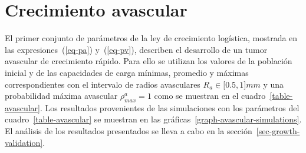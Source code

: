 \section{Crecimiento avascular}
\label{sec-avascular-results}
El primer conjunto de par\'ametros de la ley de crecimiento log\'istica, mostrada en las expresiones~(\ref{eq-pa}) y~(\ref{eq-pv}), describen el desarrollo de un tumor avascular de crecimiento r\'apido. Para ello se utilizan los valores de la poblaci\'on inicial y de las capacidades de carga m\'inimas, promedio y m\'aximas correspondientes con el intervalo de radios avasculares $R_a \in [0$.$5, 1]mm$ y una probabilidad m\'axima avascular $\rho_{max}^a=1$ como se muestran en el cuadro~\ref{table-avascular}. Los resultados provenientes de las simulaciones con los par\'ametros del cuadro~\ref{table-avascular} se muestran en las gr\'aficas~\ref{graph-avascular-simulations}. El an\'alisis de los resultados presentados se lleva a cabo en la secci\'on~\ref{sec-growth-validation}.
\begin{table}[!ht]
\begin{center}
\vspace*{-0.6cm}
\end{center}
\caption[Par\'ametros del desarrollo de un carcinoma ductal infiltrante de crecimiento r\'apido durante la etapa avascular]{Par\'ametros del desarrollo de un carcinoma ductal infiltrante de crecimiento r\'apido durante la etapa avascular.}
\label{table-avascular}
\end{table}


